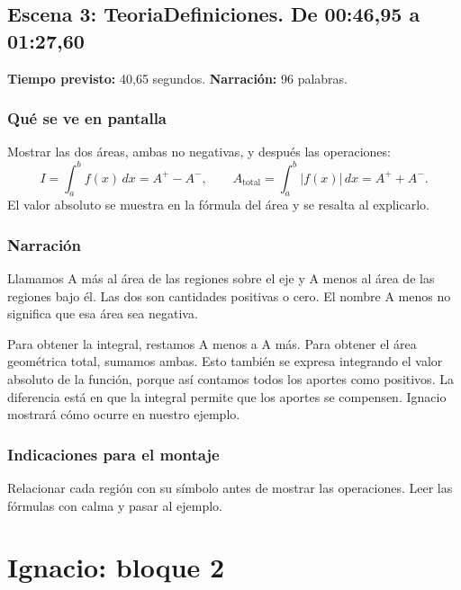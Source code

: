 \documentclass[11pt,a4paper]{article}
\newcommand{\escena}[4]{\textbf{Escena #1: #2.} De #3 a #4}
\begin{document}
\noindent\begin{minipage}[t]{\textwidth}
\subsection*{\escena{3}{TeoriaDefiniciones}{00:46,95}{01:27,60}}

\textbf{Tiempo previsto:} 40,65 segundos. \textbf{Narración:} 96 palabras.

\subsubsection*{Qué se ve en pantalla}
Mostrar las dos áreas, ambas no negativas, y después las operaciones:
\[
 I=\int_a^b f(x)\,dx=A^+-A^-,\qquad
 A_{\mathrm{total}}=\int_a^b |f(x)|\,dx=A^++A^-.
\]
El valor absoluto se muestra en la fórmula del área y se resalta al explicarlo.

\subsubsection*{Narración}
Llamamos A más al área de las regiones sobre el eje y A menos al área de las regiones bajo él. Las dos son cantidades positivas o cero. El nombre A menos no significa que esa área sea negativa.

Para obtener la integral, restamos A menos a A más. Para obtener el área geométrica total, sumamos ambas. Esto también se expresa integrando el valor absoluto de la función, porque así contamos todos los aportes como positivos. La diferencia está en que la integral permite que los aportes se compensen. Ignacio mostrará cómo ocurre en nuestro ejemplo.

\subsubsection*{Indicaciones para el montaje}
Relacionar cada región con su símbolo antes de mostrar las operaciones. Leer las fórmulas con calma y pasar al ejemplo.
\end{minipage}\par\medskip

\clearpage
\section*{Ignacio: bloque 2}
\end{document}
